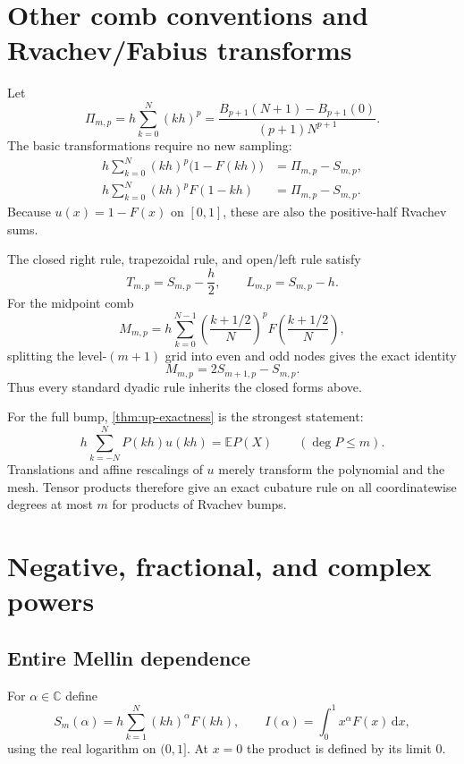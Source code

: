 \documentclass[11pt]{article}
\theoremstyle{definition}
\theoremstyle{remark}
\newcommand{\C}{\mathbb C}
\newcommand{\dd}{\,\mathrm d}
\begin{document}
\section{Other comb conventions and Rvachev/Fabius transforms}

Let
\[
 \Pi_{m,p}=h\sum_{k=0}^{N}(kh)^p
 =\frac{B_{p+1}(N+1)-B_{p+1}(0)}{(p+1)N^{p+1}}.
\]
The basic transformations require no new sampling:
\begin{align}
 h\sum_{k=0}^{N}(kh)^p\bigl(1-F(kh)\bigr)
 &=\Pi_{m,p}-S_{m,p},\label{eq:one-minus-F}\\
 h\sum_{k=0}^{N}(kh)^pF(1-kh)
 &=\Pi_{m,p}-S_{m,p}.\label{eq:F-reflected}
\end{align}
Because $u(x)=1-F(x)$ on $[0,1]$, these are also the positive-half Rvachev
sums.

The closed right rule, trapezoidal rule, and open/left rule satisfy
\begin{equation}\label{eq:rule-conversions}
 T_{m,p}=S_{m,p}-\frac h2,
 \qquad
 L_{m,p}=S_{m,p}-h.
\end{equation}
For the midpoint comb
\[
 M_{m,p}=h\sum_{k=0}^{N-1}
 \left(\frac{k+1/2}{N}\right)^p
 F\!\left(\frac{k+1/2}{N}\right),
\]
splitting the level-$(m+1)$ grid into even and odd nodes gives the exact
identity
\begin{equation}\label{eq:midpoint}
 M_{m,p}=2S_{m+1,p}-S_{m,p}.
\end{equation}
Thus every standard dyadic rule inherits the closed forms above.

For the full bump, \cref{thm:up-exactness} is the strongest statement:
\[
 h\sum_{k=-N}^{N}P(kh)u(kh)=\mathbb E P(X)
 \qquad(\deg P\le m).
\]
Translations and affine rescalings of $u$ merely transform the polynomial and
the mesh.  Tensor products therefore give an exact cubature rule on all
coordinatewise degrees at most $m$ for products of Rvachev bumps.

\section{Negative, fractional, and complex powers}

\subsection{Entire Mellin dependence}

For $\alpha\in\C$ define
\begin{equation}\label{eq:S-alpha}
 S_m(\alpha)=h\sum_{k=1}^{N}(kh)^\alpha F(kh),
 \qquad
 I(\alpha)=\int_0^1x^\alpha F(x)\dd x,
\end{equation}
using the real logarithm on $(0,1]$.  At $x=0$ the product is defined by its
limit $0$.
\end{document}
